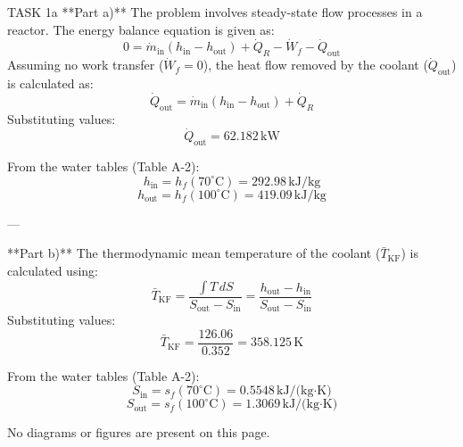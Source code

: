 TASK 1a  
**Part a)**  
The problem involves steady-state flow processes in a reactor. The energy balance equation is given as:  
\[
0 = \dot{m}_{\text{in}} (h_{\text{in}} - h_{\text{out}}) + \dot{Q}_R - \dot{W}_f - \dot{Q}_{\text{out}}
\]  
Assuming no work transfer (\( \dot{W}_f = 0 \)), the heat flow removed by the coolant (\( \dot{Q}_{\text{out}} \)) is calculated as:  
\[
\dot{Q}_{\text{out}} = \dot{m}_{\text{in}} (h_{\text{in}} - h_{\text{out}}) + \dot{Q}_R
\]  
Substituting values:  
\[
\dot{Q}_{\text{out}} = 62.182 \, \text{kW}
\]  

From the water tables (Table A-2):  
\[
h_{\text{in}} = h_f(70^\circ\text{C}) = 292.98 \, \text{kJ/kg}
\]  
\[
h_{\text{out}} = h_f(100^\circ\text{C}) = 419.09 \, \text{kJ/kg}
\]  

---

**Part b)**  
The thermodynamic mean temperature of the coolant (\( \bar{T}_{\text{KF}} \)) is calculated using:  
\[
\bar{T}_{\text{KF}} = \frac{\int T \, dS}{S_{\text{out}} - S_{\text{in}}} = \frac{h_{\text{out}} - h_{\text{in}}}{S_{\text{out}} - S_{\text{in}}}
\]  
Substituting values:  
\[
\bar{T}_{\text{KF}} = \frac{126.06}{0.352} = 358.125 \, \text{K}
\]  

From the water tables (Table A-2):  
\[
S_{\text{in}} = s_f(70^\circ\text{C}) = 0.5548 \, \text{kJ/(kg·K)}
\]  
\[
S_{\text{out}} = s_f(100^\circ\text{C}) = 1.3069 \, \text{kJ/(kg·K)}
\]  

No diagrams or figures are present on this page.
